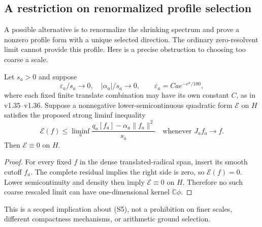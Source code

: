 \subsection*{A restriction on renormalized profile selection}

A possible alternative is to renormalize the shrinking spectrum and
prove a nonzero profile form with a unique selected direction.
The ordinary zero-resolvent limit cannot provide this profile.
Here is a precise obstruction to choosing too coarse a scale.
\begin{proposition}
\label{prop:ns43-ccm-coarse-profile}
Let $s_a>0$ and suppose
\[
 \varepsilon_a/s_a\to0,\quad |\alpha_a|/s_a\to0,
 \qquad \varepsilon_a=Ca e^{-e^a/100},
\]
where each fixed finite translate combination may have its own constant
$C$, as in v1.35--v1.36. Suppose a nonnegative lower-semicontinuous
quadratic form $\mathcal E$ on $H$ satisfies the proposed strong
liminf inequality
\[
 \mathcal E(f)\le\liminf_a
 \frac{q_a[f_a]-\alpha_a\|f_a\|^2}{s_a}
 \quad\text{whenever }J_af_a\to f.
 \tag{S5}
\]
Then $\mathcal E\equiv0$ on $H$.
\end{proposition}
\begin{proof}
For every fixed $f$ in the dense translated-radical span, insert its
smooth cutoff $f_a$. The complete residual implies the right side is
zero, so $\mathcal E(f)=0$. Lower semicontinuity and density then imply
$\mathcal E\equiv0$ on $H$. Therefore no such coarse rescaled limit
can have one-dimensional kernel $\mathbb C\phi$.
\end{proof}
This is a scoped implication about (S5), not a prohibition on finer
scales, different compactness mechanisms, or arithmetic ground selection.

